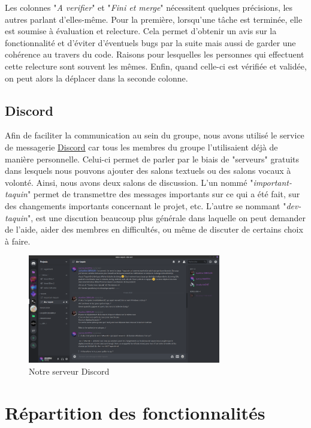 			Les colonnes "\textit{A verifier}" et "\textit{Fini et merge}" nécessitent quelques précisions, les autres parlant d'elles-même. Pour la première, lorsqu'une tâche est terminée, elle est soumise à évaluation et relecture. Cela permet d'obtenir un avis sur la fonctionnalité et d'éviter d'éventuels bugs par la suite mais aussi de garder une cohérence au travers du code. Raisons pour lesquelles les personnes qui effectuent cette relecture sont souvent les mêmes. Enfin, quand celle-ci est vérifiée et validée, on peut alors la déplacer dans la seconde colonne.

		\subsection{Discord}

			Afin de faciliter la communication au sein du groupe, nous avons utilisé le service de messagerie \href{https://discordapp.com}{Discord} car tous les membres du groupe l'utilisaient déjà de manière personnelle. Celui-ci permet de parler par le biais de "serveurs" gratuits dans lesquels nous pouvons ajouter des salons textuels ou des salons vocaux à volonté. Ainsi, nous avons deux salons de discussion. L'un nommé "\textit{important-taquin}" permet de transmettre des messages importants sur ce qui a été fait, sur des changements importants concernant le projet, etc. L'autre se nommant "\textit{dev-taquin}", est une discution beaucoup plus générale dans laquelle on peut demander de l'aide, aider des membres en difficultés, ou même de discuter de certains choix à faire.

			\begin{figure}[H]
				\centering\includegraphics[width=0.75\textwidth, keepaspectratio]{img/discord.png}
				\caption{Notre serveur Discord}
			\end{figure}

	\section{Répartition des fonctionnalités}

